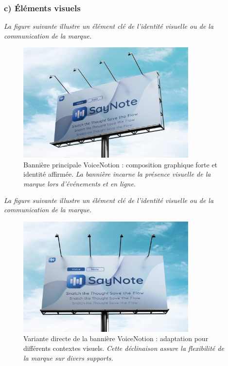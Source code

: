 \subsubsection*{c) Éléments visuels}
\noindent
\textit{La figure suivante illustre un élément clé de l'identité visuelle ou de la communication de la marque.}
\begin{figure}[H]
    \centering
    \includegraphics[width=0.8\textwidth]{docs/visual-indentity/pictures/big-banner.jpg}
    \caption{Bannière principale VoiceNotion : composition graphique forte et identité affirmée. \newline\textit{La bannière incarne la présence visuelle de la marque lors d'événements et en ligne.}}
\end{figure}
\noindent
\textit{La figure suivante illustre un élément clé de l'identité visuelle ou de la communication de la marque.}
\begin{figure}[H]
    \centering
    \includegraphics[width=0.8\textwidth]{docs/visual-indentity/pictures/big-banner-directly .jpg}
    \caption{Variante directe de la bannière VoiceNotion : adaptation pour différents contextes visuels. \newline\textit{Cette déclinaison assure la flexibilité de la marque sur divers supports.}}
\end{figure}


